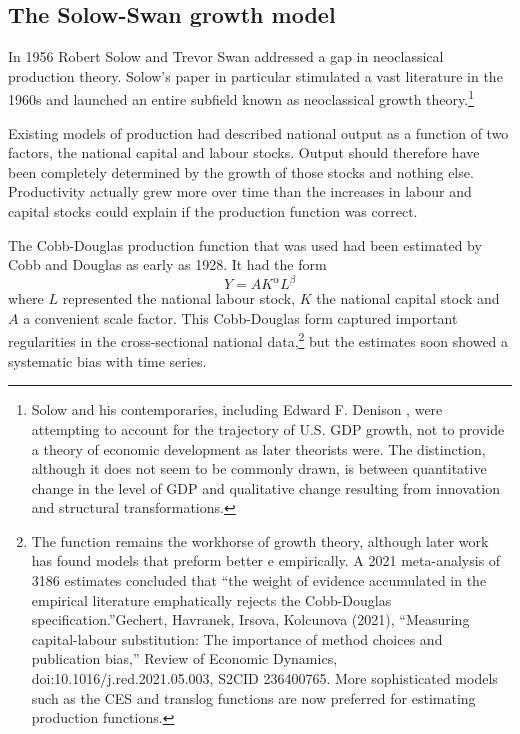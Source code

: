 \subsection{The Solow-Swan growth model}
In 1956 Robert Solow \cite{solowContributionTheoryEconomic1956} and Trevor Swan \cite{swanEconomicGrowthCapital1956}
addressed a gap in  neoclassical production theory.  Solow's paper in particular stimulated a vast literature in the 1960s and launched an entire subfield known as  neoclassical growth theory.\footnote{Solow and his contemporaries, including Edward F. Denison \cite{denisonSourcesEconomicGrowth1962}, were attempting to account for the trajectory
of U.S. GDP growth, not to provide a theory of economic development as later theorists were. The distinction, although it does not seem to be commonly drawn, is between quantitative change in the level of GDP and qualitative change resulting from innovation and structural transformations.} %


Existing models of production had described national output as a function of two  factors, the national capital and labour stocks. Output should therefore have been completely determined by the growth of those stocks and nothing else. Productivity actually grew more over time than the increases in labour and capital stocks could explain if the production function was correct.

The \gls{Cobb-Douglas} production function that was used had been estimated by Cobb and Douglas \cite{cobbTheoryProduction1928} as early as 1928. It had the form
\begin{equation*}
Y=AK^\alpha L^\beta 
 \label{eqn-Cobb-Douglas}    
\end{equation*}
where $L$ represented the national labour stock, $K$ the national capital stock and  $A$ a convenient scale factor. This \gls{Cobb-Douglas} form captured  important regularities in the cross-sectional national data,\footnote{The function remains the workhorse of growth theory, although later work has found models that preform better e empirically.  A 2021 meta-analysis of 3186 estimates concluded that ``the weight of evidence accumulated in the empirical literature emphatically rejects the Cobb-Douglas specification.''Gechert, Havranek, Irsova, Kolcunova (2021), ``Measuring capital-labour substitution: The importance of method choices and publication bias,'' Review of Economic Dynamics, doi:10.1016/j.red.2021.05.003, S2CID 236400765. More sophisticated models  such as the CES and translog functions are now preferred for estimating production functions.}  %
but the estimates soon showed a systematic bias with time series. 


